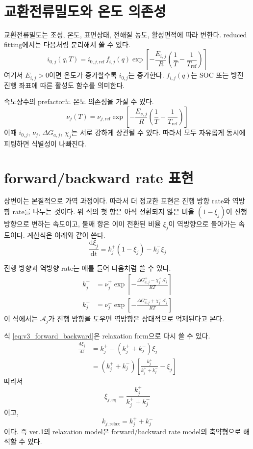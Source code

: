 \documentclass[11pt,a4paper]{article}
\newcommand{\dd}{\mathrm{d}}
\newcommand{\eq}{\mathrm{eq}}
\newcommand{\refe}{\mathrm{ref}}
\begin{document}
\section{교환전류밀도와 온도 의존성}
교환전류밀도는 조성, 온도, 표면상태, 전해질 농도, 활성면적에 따라 변한다. reduced fitting에서는 다음처럼 분리해서 쓸 수 있다.
\begin{equation}
i_{0,j}(q,T)=i_{0,j,\refe}\,f_{i,j}(q)\exp\left[-\frac{E_{i,j}}{R}\left(\frac{1}{T}-\frac{1}{T_{\refe}}\right)\right]
\label{eq:v3_i0_T}
\end{equation}
여기서 \(E_{i,j}>0\)이면 온도가 증가할수록 \(i_{0,j}\)는 증가한다. \(f_{i,j}(q)\)는 SOC 또는 방전 진행 좌표에 따른 활성도 함수를 의미한다.

속도상수의 prefactor도 온도 의존성을 가질 수 있다.
\begin{equation}
\nu_j(T)=\nu_{j,\refe}\exp\left[-\frac{E_{\nu,j}}{R}\left(\frac{1}{T}-\frac{1}{T_{\refe}}\right)\right]
\end{equation}
이때 \(i_{0,j}\), \(\nu_j\), \(\Delta G_{a,j}\), \(\chi_j\)는 서로 강하게 상관될 수 있다. 따라서 모두 자유롭게 동시에 피팅하면 식별성이 나빠진다.

\section{forward/backward rate 표현}
상변이는 본질적으로 가역 과정이다. 따라서 더 정교한 표현은 진행 방향 rate와 역방향 rate를 나누는 것이다.
위 식의 첫 항은 아직 전환되지 않은 비율 \((1-\xi_j)\)이 진행 방향으로 변하는 속도이고, 둘째 항은 이미 전환된 비율 \(\xi_j\)이 역방향으로 돌아가는 속도이다. 계산식은 아래와 같이 쓴다.
\begin{equation}
\frac{\dd\xi_j}{\dd t}=k_j^+(1-\xi_j)-k_j^-\xi_j
\label{eq:v3_forward_backward}
\end{equation}

진행 방향과 역방향 rate는 예를 들어 다음처럼 쓸 수 있다.
\begin{align}
k_j^+&=\nu_j^+\exp\left[-\frac{\Delta G_{a,j}^+-\chi_j^+\mathcal A_j}{RT}\right] \\
k_j^-&=\nu_j^-\exp\left[-\frac{\Delta G_{a,j}^-+\chi_j^-\mathcal A_j}{RT}\right]
\end{align}
이 식에서는 \(\mathcal A_j\)가 진행 방향을 도우면 역방향은 상대적으로 억제된다고 본다.

식 \eqref{eq:v3_forward_backward}은 relaxation form으로 다시 쓸 수 있다.
\begin{align}
\frac{\dd\xi_j}{\dd t}
&=k_j^+-(k_j^++k_j^-)\xi_j \\
&=(k_j^++k_j^-)\left[\frac{k_j^+}{k_j^++k_j^-}-\xi_j\right]
\end{align}
따라서
\begin{equation}
\xi_{j,\eq}=\frac{k_j^+}{k_j^++k_j^-}
\label{eq:v3_xieq_from_rates}
\end{equation}
이고,
\begin{equation}
k_{j,\mathrm{relax}}=k_j^++k_j^-
\label{eq:v3_k_relax}
\end{equation}
이다. 즉 ver.1의 relaxation model은 forward/backward rate model의 축약형으로 해석할 수 있다.
\end{document}
